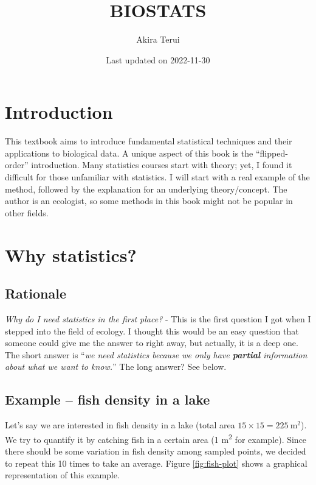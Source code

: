 \documentclass[
]{book}
\title{BIOSTATS}
\author{Akira Terui}
\date{Last updated on 2022-11-30}
\begin{document}
\maketitle

{
\setcounter{tocdepth}{1}
\tableofcontents
}
\hypertarget{introduction}{%
\chapter*{Introduction}\label{introduction}}

This textbook aims to introduce fundamental statistical techniques and their applications to biological data. A unique aspect of this book is the ``flipped-order'' introduction. Many statistics courses start with theory; yet, I found it difficult for those unfamiliar with statistics. I will start with a real example of the method, followed by the explanation for an underlying theory/concept. The author is an ecologist, so some methods in this book might not be popular in other fields.

\hypertarget{why-statistics}{%
\chapter{Why statistics?}\label{why-statistics}}

\hypertarget{rationale}{%
\section{Rationale}\label{rationale}}

\emph{Why do I need statistics in the first place?} - This is the first question I got when I stepped into the field of ecology. I thought this would be an easy question that someone could give me the answer to right away, but actually, it is a deep one. The short answer is ``\emph{we need statistics because we only have \textbf{partial} information about what we want to know.}'' The long answer? See below.

\hypertarget{example-fish-density-in-a-lake}{%
\section{Example -- fish density in a lake}\label{example-fish-density-in-a-lake}}

Let's say we are interested in fish density in a lake (total area \(15 \times 15 = 225~\text{m}^2\)). We try to quantify it by catching fish in a certain area (1 m\textsuperscript{2} for example). Since there should be some variation in fish density among sampled points, we decided to repeat this 10 times to take an average. Figure \ref{fig:fish-plot} shows a graphical representation of this example.
\end{document}
